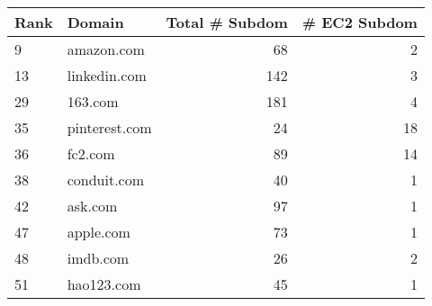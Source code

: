\begin{tabular}{|l|l|r|r|}
\hline
\textbf{Rank} & \textbf{Domain} & \textbf{Total \# Subdom} & \textbf{\# EC2
    Subdom}\\ 
\hline
9      & amazon.com  & 68 & 2\\
13      & linkedin.com  & 142  & 3\\
29      & 163.com    & 181 & 4    \\
35      & pinterest.com  &  24  & 18\\
36      & fc2.com   &  89 &  14\\
38      & conduit.com  & 40 &  1\\
42      & ask.com   &   97&  1 \\
47      & apple.com   &  73&  1\\
48     & imdb.com    &  26&  2 \\
51     & hao123.com    & 45 & 1\\
\hline
\end{tabular}


